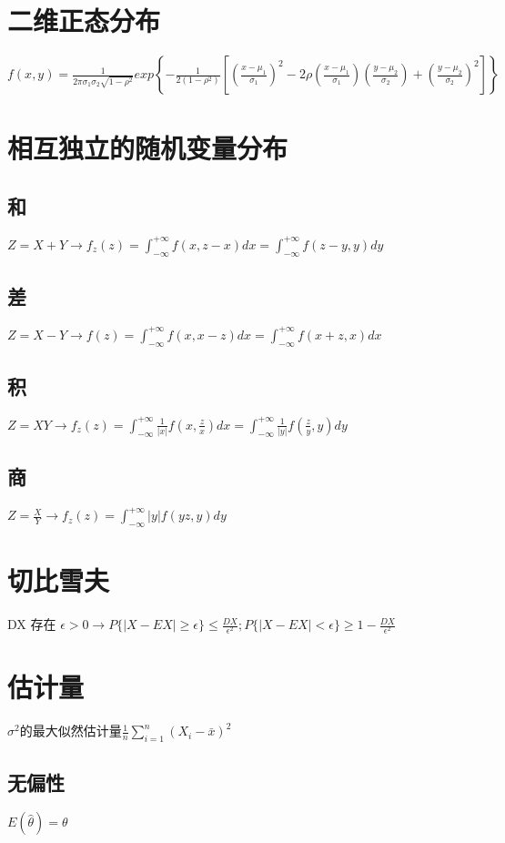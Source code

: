 \documentclass[UTF8]{ctexart}
\begin{document}
\section{二维正态分布}
$f(x,y)=\frac{1}{2 \pi \sigma_1 \sigma_2 \sqrt {1- \rho ^2 }}exp
\left\{
 - \frac{1}{2(1- \rho^2)}
\left[
 {(\frac{x- \mu_1}{\sigma_1})}^2
 -2 \rho
 (\frac{x- \mu_1}{\sigma_1})
 (\frac{y-\mu_2}{\sigma_2})
 +{(\frac{y-\mu_2}{\sigma_2})}^2
 \right]
 \right\}
$
\section{相互独立的随机变量分布}
\subsection{和}
$Z=X+Y \longrightarrow f_z(z)=\int_{-\infty}^{+\infty}f(x,z-x)dx=\int_{-\infty}^{+\infty}f(z-y,y)dy$ \\
\subsection{差}
$Z=X-Y \longrightarrow f(z)=\int_{-\infty}^{+\infty}f(x,x-z)dx=\int_{-\infty}^{+\infty}f(x+z,x)dx$
\subsection{积}
$Z=XY \longrightarrow f_z(z) = \int_{-\infty}^{+\infty}
\frac{1}{|x|}
f(x,\frac{z}{x})
dx=
\int_{-\infty}^{+\infty}
\frac{1}{|y|}
f(\frac{z}{y},{y})
dy
$
\subsection{商}
$Z=\frac{X}{Y} \longrightarrow
f_z(z)=
\int_{-\infty}^{+\infty}
|y|
f(yz,y)
dy
$
\section{切比雪夫}
DX 存在
$\epsilon>0
\rightarrow P\{|X-EX|\geq \epsilon\}\leq\frac{DX}{\epsilon^2} ;
P\{|X-EX|< \epsilon\}\geq1-\frac{DX}{\epsilon^2}$

\section{估计量}
$\sigma^2$的最大似然估计量$\frac{1}{n}
\sum_{i=1}^n
{(X_i - \bar{x})}^2$
\subsection{无偏性} 
$E(\hat{\theta})=\theta$ 
\end{document}
